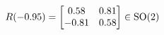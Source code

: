 \documentclass[preview]{standalone}
\begin{document}
\begin{align*}
\special{dvisvgm:raw <g id='unique000'>}R(-0.95) = \begin{bmatrix} 0.58 & 0.81 \\ -0.81 & 0.58 \end{bmatrix} \in \text{SO}(2)\special{dvisvgm:raw </g>}
\end{align*}
\end{document}
